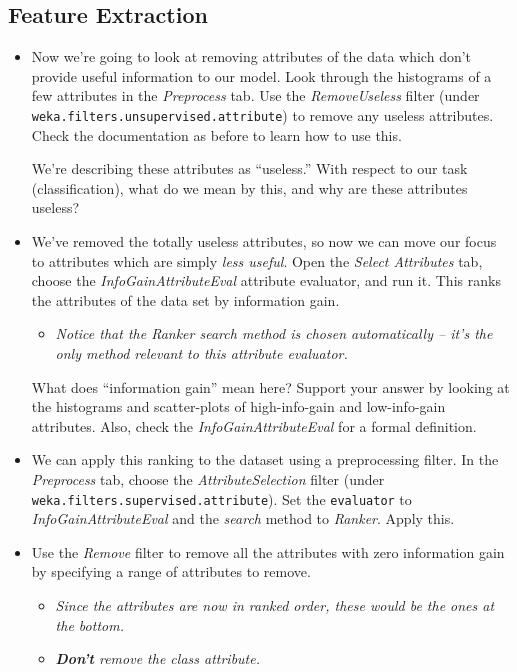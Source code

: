 \documentclass[11pt]{cselabheader}
\begin{document}
\subsection{Feature Extraction}
\begin{itemize}[leftmargin=*]
  \item Now we're going to look at removing attributes of the data which don't provide useful information to our model. Look through the histograms of a few attributes in the \emph{Preprocess} tab. Use the \emph{RemoveUseless} filter (under \texttt{weka.filters.unsupervised.attribute}) to remove any useless attributes. Check the documentation as before to learn how to use this.

  \begin{ex}
    We're describing these attributes as ``useless.'' With respect to our task (classification), what do we mean by this, and why are these attributes useless?
  \end{ex}

  \item We've removed the totally useless attributes, so now we can move our focus to attributes which are simply \emph{less useful}. Open the \emph{Select Attributes} tab, choose the \emph{InfoGainAttributeEval} attribute evaluator, and run it. This ranks the attributes of the data set by information gain.
  \begin{itemize}[leftmargin=*]
    \item \textit{Notice that the \emph{Ranker} search method is chosen automatically -- it's the only method relevant to this attribute evaluator.}
  \end{itemize}

  \begin{ex}
    What does ``information gain'' mean here? Support your answer by looking at the histograms and scatter-plots of high-info-gain and low-info-gain attributes. Also, check the \emph{InfoGainAttributeEval} for a formal definition.
  \end{ex}

  \item We can apply this ranking to the dataset using a preprocessing filter. In the \emph{Preprocess} tab, choose the \emph{AttributeSelection} filter (under \texttt{weka.filters.supervised.attribute}). Set the \texttt{evaluator} to \emph{InfoGainAttributeEval} and the \emph{search} method to \emph{Ranker}. Apply this.

  \item Use the \emph{Remove} filter to remove all the attributes with zero information gain by specifying a range of attributes to remove.
  \begin{itemize}[leftmargin=*]
    \item \textit{Since the attributes are now in ranked order, these would be the ones at the bottom.}
    \item \textit{\textbf{Don't} remove the class attribute.}
  \end{itemize}


\end{itemize}
\end{document}
